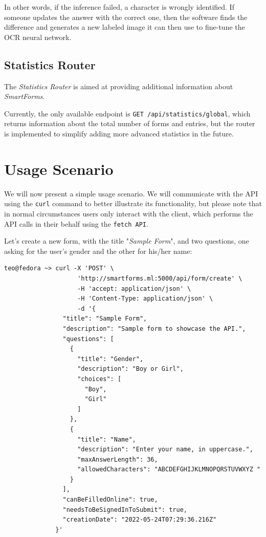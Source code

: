 \documentclass[11pt, a4paper]{report}
\def\code#1{\texttt{#1}}
\begin{document}
In other words, if the inference failed, a character is wrongly identified. If someone updates the answer with the correct one, then the software finds the difference and generates a new labeled image it can then use to fine-tune the OCR neural network.

\subsection{Statistics Router}

The \textit{Statistics Router} is aimed at providing additional information about \textit{SmartForms}.

Currently, the only available endpoint is \code{GET /api/statistics/global}, which returns information about the total number of forms and entries, but the router is implemented to simplify adding more advanced statistics in the future.

\section{Usage Scenario}

We will now present a simple usage scenario. We will communicate with the API using the \code{curl} command to better illustrate its functionality, but please note that in normal circumstances users only interact with the client, which performs the API calls in their behalf using the \code{fetch API}.

Let's create a new form, with the title "\textit{Sample Form}", and two questions, one asking for the user's gender and the other for his/her name:

\begin{verbatim}
teo@fedora ~> curl -X 'POST' \
                    'http://smartforms.ml:5000/api/form/create' \
                    -H 'accept: application/json' \
                    -H 'Content-Type: application/json' \
                    -d '{
                "title": "Sample Form",
                "description": "Sample form to showcase the API.",
                "questions": [
                  {
                    "title": "Gender",
                    "description": "Boy or Girl",
                    "choices": [
                      "Boy",
                      "Girl"
                    ]
                  },
                  {
                    "title": "Name",
                    "description": "Enter your name, in uppercase.",
                    "maxAnswerLength": 36,
                    "allowedCharacters": "ABCDEFGHIJKLMNOPQRSTUVWXYZ "
                  }
                ],
                "canBeFilledOnline": true,
                "needsToBeSignedInToSubmit": true,
                "creationDate": "2022-05-24T07:29:36.216Z"
              }'
\end{verbatim}
\end{document}

